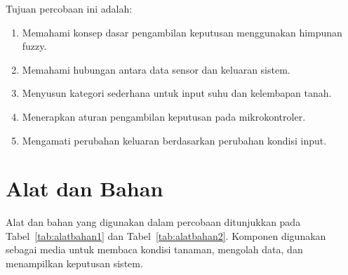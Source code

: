 \documentclass[12pt,a4paper]{article}
\begin{document}
Tujuan percobaan ini adalah:
\begin{enumerate}
    \item Memahami konsep dasar pengambilan keputusan menggunakan himpunan fuzzy.
    \item Memahami hubungan antara data sensor dan keluaran sistem.
    \item Menyusun kategori sederhana untuk input suhu dan kelembapan tanah.
    \item Menerapkan aturan pengambilan keputusan pada mikrokontroler.
    \item Mengamati perubahan keluaran berdasarkan perubahan kondisi input.
\end{enumerate}

\section{Alat dan Bahan}

Alat dan bahan yang digunakan dalam percobaan ditunjukkan pada Tabel~\ref{tab:alatbahan1} dan Tabel~\ref{tab:alatbahan2}. Komponen digunakan sebagai media untuk membaca kondisi tanaman, mengolah data, dan menampilkan keputusan sistem.
\end{document}
